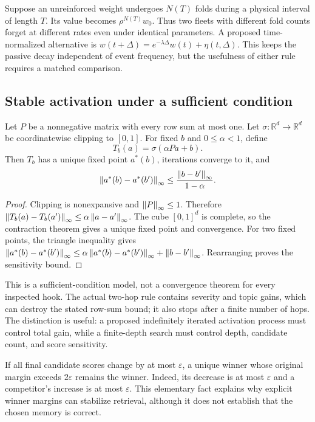 Suppose an unreinforced weight undergoes $N(T)$ folds during a physical interval of length $T$. Its value becomes $\rho^{N(T)}w_0$. Thus two fleets with different fold counts forget at different rates even under identical parameters. A proposed time-normalized alternative is
$w(t+\Delta)=e^{-\lambda\Delta}w(t)+\eta(t,\Delta)$.
This keeps the passive decay independent of event frequency, but the usefulness of either rule requires a matched comparison.

\subsection{Stable activation under a sufficient condition}

\begin{proposition}
Let $P$ be a nonnegative matrix with every row sum at most one. Let $\sigma:\mathbb{R}^d\to\mathbb{R}^d$ be coordinatewise clipping to $[0,1]$. For fixed $b$ and $0\leq\alpha<1$, define
\[
T_b(a)=\sigma(\alpha Pa+b).
\]
Then $T_b$ has a unique fixed point $a^\ast(b)$, iterations converge to it, and
\[
\left\lVert a^\ast(b)-a^\ast(b')\right\rVert_\infty
\leq \frac{\left\lVert b-b'\right\rVert_\infty}{1-\alpha}.
\]
\end{proposition}
\begin{proof}
Clipping is nonexpansive and $\left\lVert P\right\rVert_\infty\leq1$. Therefore
$\left\lVert T_b(a)-T_b(a')\right\rVert_\infty\leq\alpha\left\lVert a-a'\right\rVert_\infty$.
The cube $[0,1]^d$ is complete, so the contraction theorem gives a unique fixed point and convergence. For two fixed points, the triangle inequality gives
$\left\lVert a^\ast(b)-a^\ast(b')\right\rVert_\infty
\leq\alpha\left\lVert a^\ast(b)-a^\ast(b')\right\rVert_\infty+\left\lVert b-b'\right\rVert_\infty$.
Rearranging proves the sensitivity bound.
\end{proof}

This is a sufficient-condition model, not a convergence theorem for every inspected hook. The actual two-hop rule contains severity and topic gains, which can destroy the stated row-sum bound; it also stops after a finite number of hops. The distinction is useful: a proposed indefinitely iterated activation process must control total gain, while a finite-depth search must control depth, candidate count, and score sensitivity.

If all final candidate scores change by at most $\varepsilon$, a unique winner whose original margin exceeds $2\varepsilon$ remains the winner. Indeed, its decrease is at most $\varepsilon$ and a competitor's increase is at most $\varepsilon$. This elementary fact explains why explicit winner margins can stabilize retrieval, although it does not establish that the chosen memory is correct.

